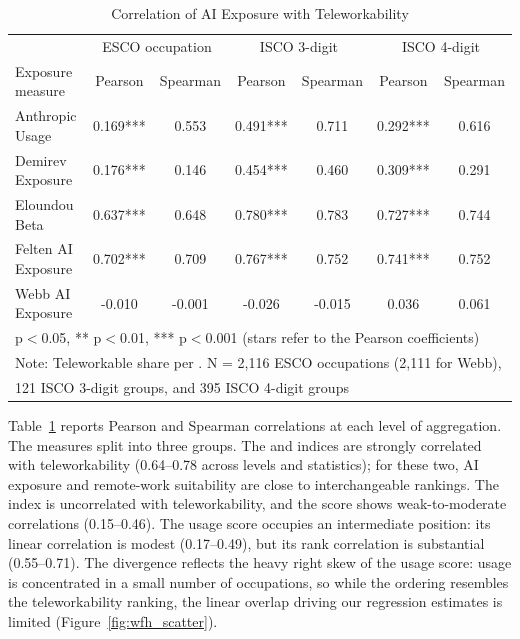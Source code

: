 \documentclass[11pt]{article}
\begin{document}
\begin{table}[H]
\centering
\caption{Correlation of AI Exposure with Teleworkability}
\begin{tabular}{lcccccc}
\hline\hline
 & \multicolumn{2}{c}{ESCO occupation} & \multicolumn{2}{c}{ISCO 3-digit} & \multicolumn{2}{c}{ISCO 4-digit} \\
Exposure measure & Pearson & Spearman & Pearson & Spearman & Pearson & Spearman \\
\midrule
Anthropic Usage & 0.169*** & 0.553 & 0.491*** & 0.711 & 0.292*** & 0.616 \\
Demirev Exposure & 0.176*** & 0.146 & 0.454*** & 0.460 & 0.309*** & 0.291 \\
Eloundou Beta & 0.637*** & 0.648 & 0.780*** & 0.783 & 0.727*** & 0.744 \\
Felten AI Exposure & 0.702*** & 0.709 & 0.767*** & 0.752 & 0.741*** & 0.752 \\
Webb AI Exposure & -0.010 & -0.001 & -0.026 & -0.015 & 0.036 & 0.061 \\
\hline\hline
\multicolumn{7}{l}{\footnotesize * p$<$0.05, ** p$<$0.01, *** p$<$0.001 (stars refer to the Pearson coefficients)} \\
\multicolumn{7}{l}{\footnotesize Note: Teleworkable share per \citet{dingel2020teleworkable}. N = 2,116 ESCO occupations (2,111 for Webb),} \\
\multicolumn{7}{l}{\footnotesize 121 ISCO 3-digit groups, and 395 ISCO 4-digit groups} \\
\end{tabular}
\label{table:wfh_correlations}
\end{table}

Table~\ref{table:wfh_correlations} reports Pearson and Spearman correlations at each level of aggregation. The measures split into three groups. The \citet{felten_method_2018} and \citet{eloundou_gpts_2023} indices are strongly correlated with teleworkability (0.64--0.78 across levels and statistics); for these two, AI exposure and remote-work suitability are close to interchangeable rankings. The \citet{webb_impact_2022} index is uncorrelated with teleworkability, and the \citet{demirev2024assessing} score shows weak-to-moderate correlations (0.15--0.46). The \citet{handa2025economic} usage score occupies an intermediate position: its linear correlation is modest (0.17--0.49), but its rank correlation is substantial (0.55--0.71). The divergence reflects the heavy right skew of the usage score: usage is concentrated in a small number of occupations, so while the ordering resembles the teleworkability ranking, the linear overlap driving our regression estimates is limited (Figure~\ref{fig:wfh_scatter}).
\end{document}
